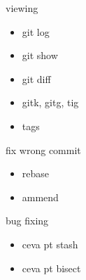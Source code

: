 \documentclass{beamer}
\begin{document}
\begin{frame}{viewing}
  \begin{itemize}
    \item git log
    \item git show
    \item git diff %
    \item gitk, gitg, tig
    \item tags
  \end{itemize}
\end{frame}
\begin{frame}{fix wrong commit}
  \begin{itemize}
    \item rebase
    \item ammend
  \end{itemize}
\end{frame}

\begin{frame}{bug fixing}
  \begin{itemize}
    \item ceva pt stash
    \item ceva pt bisect
  \end{itemize}
\end{frame}
\end{document}

